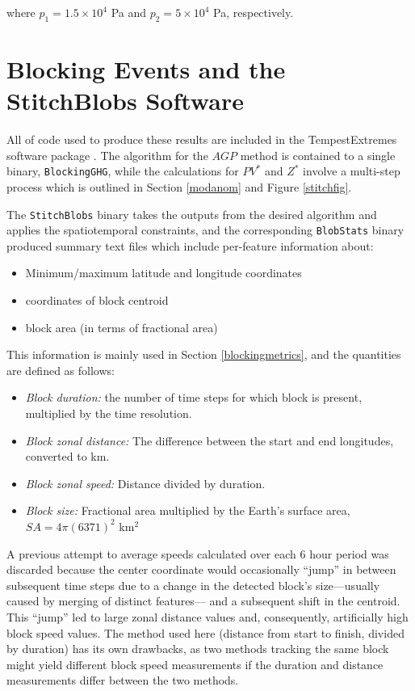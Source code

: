 \documentclass[smallextended]{svjour3}       %
\numberwithin{equation}{section}
\begin{document}
\begin{appendices}
\noindent
where $p_1=1.5\times 10^4$ Pa and $p_2=5\times 10^4$ Pa, respectively.
\section{Blocking Events and the StitchBlobs Software}\label{stitchdesc}

All of code used to produce these results are included in the TempestExtremes software package \citep{ullrich_tempestextremes:_2017}. The algorithm for the $AGP$ method is contained to a single binary, \texttt{BlockingGHG}, while the calculations for $PV^*$ and $Z^*$ involve a multi-step process which is outlined in Section \ref{modanom} and Figure \ref{stitchfig}. 


The \texttt{StitchBlobs} binary takes the outputs from the desired algorithm and applies the spatiotemporal constraints, and the corresponding \texttt{BlobStats} binary produced summary text files which include per-feature information about:
\begin{itemize}
\item Minimum/maximum latitude and longitude coordinates
\item coordinates of block centroid
\item block area (in terms of fractional area)
\end{itemize}

This information is mainly used in Section \ref{blockingmetrics}, and the quantities are defined as follows:

\begin{itemize}
\item \textit{Block duration:} the number of time steps for which block is present, multiplied by the time resolution.
\item \textit{Block zonal distance:} The difference between the start and end longitudes, converted to km.
\item \textit{Block zonal speed:} Distance divided by duration.
\item \textit{Block size:} Fractional area multiplied by the Earth's surface area, $SA = 4\pi (6371)^2$ km$^2$
\end{itemize}

A previous attempt to average speeds calculated over each 6 hour period was discarded because the center coordinate would occasionally ``jump'' in between subsequent time steps due to a change in the detected block's size---usually caused by merging of distinct features--- and a subsequent shift in the centroid. This ``jump'' led to large zonal distance values and, consequently, artificially high block speed values. The method used here (distance from start to finish, divided by duration) has its own drawbacks, as two methods tracking the same block might yield different block speed measurements if the duration and distance measurements differ between the two methods.


\end{appendices}
\end{document}
